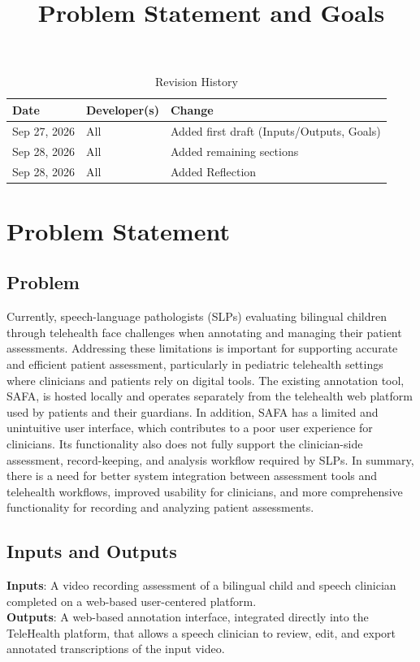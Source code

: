 \documentclass{article}
\title{Problem Statement and Goals\\\progname}
\author{\authname}
\date{}
\begin{document}
\maketitle

\begin{table}[hp]
\caption{Revision History} \label{TblRevisionHistory}
\begin{tabularx}{\textwidth}{llX}
\toprule
\textbf{Date} & \textbf{Developer(s)} & \textbf{Change}\\
\midrule
Sep 27, 2026 & All & Added first draft (Inputs/Outputs, Goals)\\
Sep 28, 2026 & All & Added remaining sections\\
Sep 28, 2026 & All & Added Reflection\\
\bottomrule
\end{tabularx}
\end{table}

\section{Problem Statement}


\subsection{Problem}

Currently, speech-language pathologists (SLPs) evaluating bilingual children through 
telehealth face challenges when annotating and managing their patient assessments. 
Addressing these limitations is important for supporting accurate and efficient 
patient assessment, particularly in pediatric telehealth settings where clinicians and 
patients rely on digital tools. The existing annotation tool, SAFA, is hosted locally and 
operates separately from the telehealth web platform used by patients and their guardians. 
In addition, SAFA has a limited and unintuitive user interface, which contributes to a poor 
user experience for clinicians. Its functionality also does not fully support the clinician-side
 assessment, record-keeping, and analysis workflow required by SLPs. 
 In summary, there is a need for better system integration between assessment tools and 
 telehealth workflows, improved usability for clinicians, and more comprehensive functionality for 
 recording and analyzing patient assessments.

\subsection{Inputs and Outputs}
\textbf{Inputs}: A video recording assessment of a bilingual child and speech clinician completed on a web-based user-centered platform. \\
\textbf{Outputs}: A web-based annotation interface, integrated directly into the TeleHealth platform, that allows a speech clinician to review, edit, and export annotated transcriptions of the input video.
\end{document}
